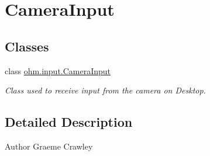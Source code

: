 \hypertarget{group___camera_input}{}\section{Camera\+Input}
\label{group___camera_input}
\subsection*{Classes}
\begin{DoxyCompactItemize}
\item 
class \hyperlink{classohm_1_1input_1_1_camera_input}{ohm.\+input.\+Camera\+Input}
\begin{DoxyCompactList}\small\item\em Class used to receive input from the camera on Desktop. \end{DoxyCompactList}\end{DoxyCompactItemize}


\subsection{Detailed Description}
\begin{DoxyAuthor}{Author}
Graeme Crawley 
\end{DoxyAuthor}
